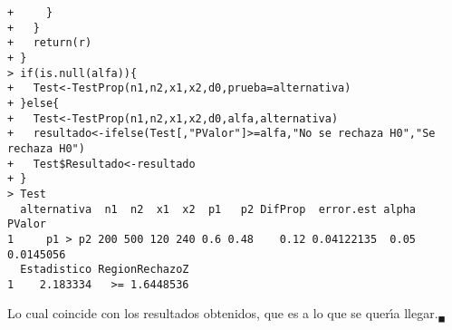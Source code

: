\begin{solucion}
\begin{verbatim}
+     }
+   }
+   return(r)
+ }
> if(is.null(alfa)){
+   Test<-TestProp(n1,n2,x1,x2,d0,prueba=alternativa)
+ }else{
+   Test<-TestProp(n1,n2,x1,x2,d0,alfa,alternativa)
+   resultado<-ifelse(Test[,"PValor"]>=alfa,"No se rechaza H0","Se rechaza H0")
+   Test$Resultado<-resultado
+ }
> Test
  alternativa  n1  n2  x1  x2  p1   p2 DifProp  error.est alpha    PValor
1     p1 > p2 200 500 120 240 0.6 0.48    0.12 0.04122135  0.05 0.0145056
  Estadistico RegionRechazoZ
1    2.183334   >= 1.6448536
 \end{verbatim}
 \vspace{-0.5cm}
 Lo cual coincide con los resultados obtenidos,
 que es a lo que se quer\'{\i}a llegar.${}_{\blacksquare}$
\end{solucion}
